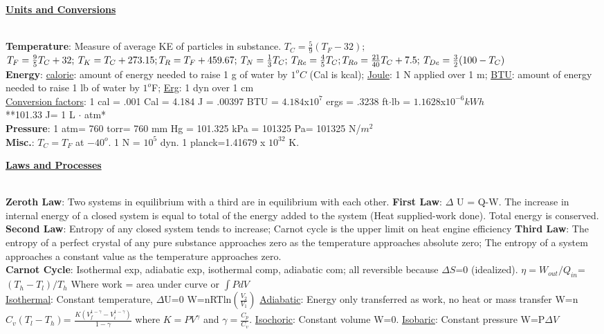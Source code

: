\documentclass{article}
\begin{document}
\begin{multicols*}{3}{}
\begin{small}
\textbf{\underline{Units and Conversions}}
\end{small} 
\\
\fontsize{8pt}{8.25pt}\selectfont	
\textbf{Temperature}: Measure of average KE of particles in substance. $T_{C}=\frac{5}{9}(T_{F}-32);$ \\ $T_{F}=\frac{9}{5}T_{C} + 32; \: T_{K}= T_{C}+273.15; \: \\ T_{R}=T_{F}+459.67; \: T_{N}=\frac{1}{3}T_{C}; \: T_{Re}=\frac{4}{5}T_{C}; \\ T_{Ro}= \frac{21}{40}T_{C}+7.5; \:  T_{De}=\frac{3}{2}(100-T_{C})$ \\
	\textbf{Energy}: \underline{calorie}: amount of energy needed to raise 1 g of water by $1 ^{o}C$ (Cal is kcal); \underline{Joule}: 1 N applied over 1 m; \underline{BTU}: amount of energy needed to raise 1 lb of water by $1 ^{o}$F; \underline{Erg}: 1 dyn over 1 cm \\ \underline{Conversion factors}: 1 cal = .001 Cal = 4.184 J = .00397 BTU = $4.184$x$10^{7}$  ergs = .3238 ft$ \cdot$lb = $1.1628$x$10^{-6} kWh$ \\ **101.33 J= 1 L $\cdot$ atm*
\\
\textbf{Pressure}: 1 atm= 760 torr= 760 mm Hg = 101.325 kPa = 101325 Pa= 101325 N/$m^{2}$ 
\\
\textbf{Misc.}: $T_{C}=T_{F}$ at $-40^{o}$. 1 N = $10^{5}$ dyn. 1 planck=1.41679 x $10^{32}$ K.
\\
\begin{small}
		\textbf{\underline{Laws and Processes}}
\end{small}
\\
\textbf{Zeroth Law}: Two systems in equilibrium with a third are in equilibrium with each other.
\textbf{First Law}: $\Delta$ U = Q-W. The increase in internal energy of a closed system is equal to total of the energy added to the system (Heat supplied-work done). Total energy is conserved.
\textbf{Second Law}: Entropy of any closed system tends to increase; Carnot cycle is the upper limit on heat engine efficiency
\textbf{Third Law}: The entropy of a perfect crystal of any pure substance approaches zero as the temperature approaches absolute zero; The entropy of a system approaches a constant value as the temperature approaches zero.\\

\textbf{Carnot Cycle}: Isothermal exp, adiabatic exp, isothermal comp, adiabatic com; all reversible because $\Delta S$=0 (idealized). $\eta = W_{out}/Q_{in}$=$(T_{h}-T_{l})/T_{h}$
Where work = area under curve or $\int P dV$ \\
\underline{Isothermal}: Constant temperature, $\Delta$U=0 W=nRTln$(\frac{V_{2}}{V_{1}})$ \underline{Adiabatic}: Energy only transferred as work, no heat or mass transfer W=n$C_{v}(T_{l}-T_{h})$= $\frac{K(V_{f}^{1-\gamma}-V_{i}^{1-\gamma})}{1-\gamma}$ where $K=PV^{\gamma}$ and $\gamma=\frac{C_{p}}{C_{v}}$. \underline{Isochoric}: Constant volume W=0. \underline{Isobaric}: Constant pressure W=P$\Delta V$ \\


\end{multicols*}
\end{document}
